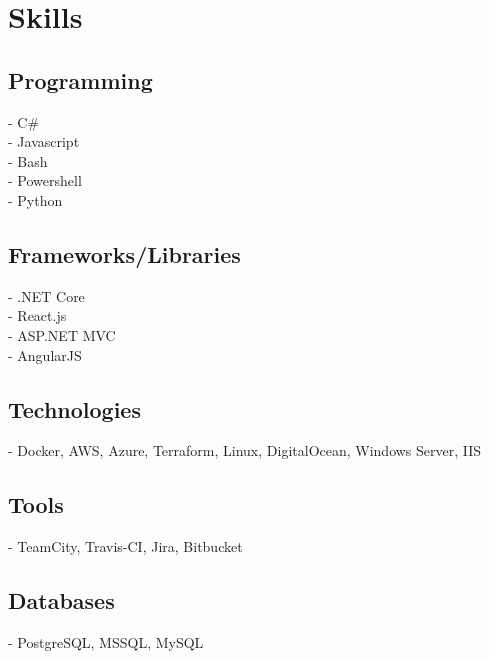 \documentclass[]{Resume}
\begin{document}
\begin{minipage}[t]{0.33\textwidth}

\section{Skills}
\subsection{Programming}
- C\# \\
- Javascript \\
- Bash \\ 
- Powershell \\
- Python
\sectionsep

\subsection{Frameworks/Libraries}
- .NET Core \\
- React.js \\
- ASP.NET MVC \\
- AngularJS
\sectionsep

\subsection{Technologies}
- Docker, AWS, Azure, Terraform, Linux, DigitalOcean, Windows Server, IIS
\sectionsep

\subsection{Tools}
- TeamCity, Travis-CI, Jira, Bitbucket 
\sectionsep

\subsection{Databases}
- PostgreSQL, MSSQL, MySQL
\sectionsep



%
%

\end{minipage} 
\hfill
\end{document}
